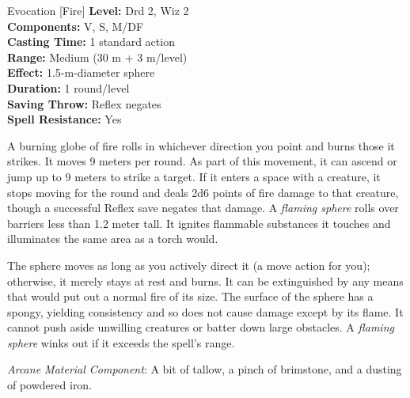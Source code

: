 {Evocation [Fire]}
{
	\textbf{Level:}
	Drd 2, Wiz 2\\
	\textbf{Components:}
	V, S, M/DF\\
	\textbf{Casting Time:}
	1 standard action\\
	\textbf{Range:}
	Medium (30 m + 3 m/level)\\
	\textbf{Effect:}
	1.5-m-diameter sphere\\
	\textbf{Duration:}
	1 round/level\\
	\textbf{Saving Throw:}
	Reflex negates\\
	\textbf{Spell Resistance:}
	Yes\\
}
{
	A burning globe of fire rolls in whichever direction you point and burns those it strikes. It moves 9 meters per round. As part of this movement, it can ascend or jump up to 9 meters to strike a target. If it enters a space with a creature, it stops moving for the round and deals 2d6 points of fire damage to that creature, though a successful Reflex save negates that damage. A \emph{flaming sphere} rolls over barriers less than 1.2 meter tall. It ignites flammable substances it touches and illuminates the same area as a torch would.

	The sphere moves as long as you actively direct it (a move action for you); otherwise, it merely stays at rest and burns. It can be extinguished by any means that would put out a normal fire of its size. The surface of the sphere has a spongy, yielding consistency and so does not cause damage except by its flame. It cannot push aside unwilling creatures or batter down large obstacles. A \emph{flaming sphere} winks out if it exceeds the spell's range.

	\textit{Arcane Material Component}:
	A bit of tallow, a pinch of brimstone, and a dusting of powdered iron.

}

